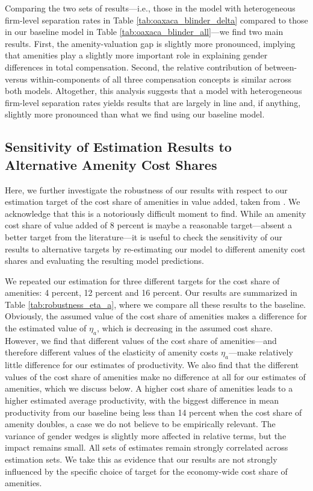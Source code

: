 Comparing the two sets of results---i.e., those in the model with heterogeneous firm-level separation rates in Table \ref{tab:oaxaca_blinder_delta} compared to those in our baseline model in Table \ref{tab:oaxaca_blinder_all}---we find two main results. First, the amenity-valuation gap is slightly more pronounced, implying that amenities play a slightly more important role in explaining gender differences in total compensation. Second, the relative contribution of between- versus within-components of all three compensation concepts is similar across both models. Altogether, this analysis suggests that a model with heterogeneous firm-level separation rates yields results that are largely in line and, if anything, slightly more pronounced than what we find using our baseline model.


\subsection{Sensitivity of Estimation Results to Alternative Amenity Cost Shares\label{app:alt_amenity_cost_shares}}

Here, we further investigate the robustness of our results with respect to our estimation target of the cost share of amenities in value added, taken from \citet{BieriKuminoffPope2023}. We acknowledge that this is a notoriously difficult moment to find. While an amenity cost share of value added of 8 percent is maybe a reasonable target---absent a better target from the literature---it is useful to check the sensitivity of our results to alternative targets by re-estimating our model to different amenity cost shares and evaluating the resulting model predictions.

We repeated our estimation for three different targets for the cost share of amenities: 4 percent, 12 percent and 16 percent. Our results are summarized in Table \ref{tab:robustness_eta_a}, where we compare all these results to the baseline. Obviously, the assumed value of the cost share of amenities makes a difference for the estimated value of $\eta_{a}$, which is decreasing in the assumed cost share. However, we find that different values of the cost share of amenities---and therefore different values of the elasticity of amenity costs $\eta_{a}$---make relatively little difference for our estimates of productivity. We also find that the different values of the cost share of amenities make no difference at all for our estimates of amenities, which we discuss below. A higher cost share of amenities leads to a higher estimated average productivity, with the biggest difference in mean productivity from our baseline being less than 14 percent when the cost share of amenity doubles, a case we do not believe to be empirically relevant. The variance of gender wedges is slightly more affected in relative terms, but the impact remains small. All sets of estimates remain strongly correlated across estimation sets. We take this as evidence that our results are not strongly influenced by the specific choice of target for the economy-wide cost share of amenities.%

